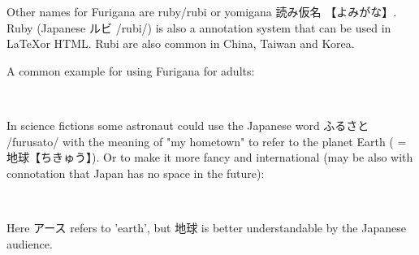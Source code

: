 Other names for Furigana are ruby/rubi or yomigana {読み仮名} {【よみがな】}.
Ruby (Japanese {ルビ} /rubi/) is also a annotation system that can be used in
\LaTeX or HTML. Rubi are  also common in China, Taiwan and Korea. 

A common example for using Furigana for adults:

\begin{center}
\Huge {}　
\end{center}

In science fictions some astronaut could use the Japanese word {ふるさと}
/furusato/  with the meaning of "my hometown" to refer to the planet Earth ( =
{地球}{【ちきゅう】}). Or to make it more fancy and international (may be also
with connotation that Japan has no space in the future):

\begin{center}
\Huge {}　
\end{center}

Here {アース} refers to 'earth', but {地球} is better understandable by the
Japanese audience.

